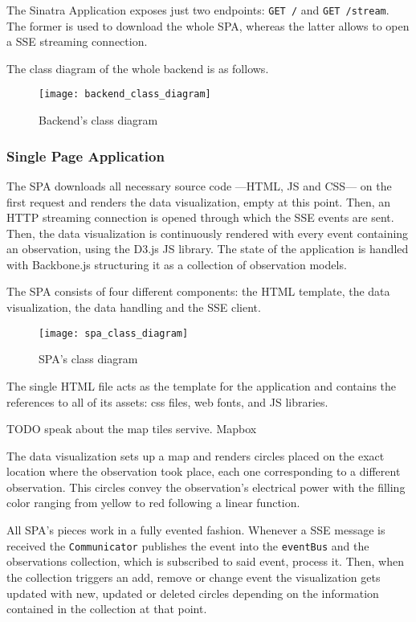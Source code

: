 The Sinatra Application exposes just two endpoints: \texttt{GET /} and \texttt{GET /stream}. The former is used to download the whole SPA, whereas the latter allows to open a SSE streaming connection.

The class diagram of the whole backend is as follows.

\begin{figure}[H]
	\centering
	\texttt{[image: backend\_class\_diagram]}
	\caption{Backend's class diagram}
	\label{fig:backend_class_diagram}
\end{figure}

\subsubsection{Single Page Application}

The SPA downloads all necessary source code ---HTML, JS and CSS--- on the first request and renders the data visualization, empty at this point. Then, an HTTP streaming connection is opened  through which the SSE events are sent. Then, the data visualization is continuously rendered with every event containing an observation, using the D3.js JS library. The state of the application is handled with Backbone.js structuring it as a collection of observation models.

The SPA consists of four different components: the HTML template, the data visualization, the data handling and the SSE client.

\begin{figure}[p]
	\centering
	\texttt{[image: spa\_class\_diagram]}
	\caption{SPA's class diagram}
	\label{fig:spa_class_diagram}
\end{figure}

The single HTML file acts as the template for the application and contains the references to all of its assets: css files, web fonts, and JS libraries.

TODO speak about the map tiles servive. Mapbox

The data visualization sets up a map and renders circles placed on the exact location where the observation took place, each one corresponding to a different observation. This circles convey the observation's electrical power with the filling color ranging from yellow to red following a linear function.

All SPA's pieces work in a fully evented fashion. Whenever a SSE message is received the \texttt{Communicator} publishes the event into the \texttt{eventBus} and the observations collection, which is subscribed to said event, process it. Then, when the collection triggers an add, remove or change event the visualization gets updated with new, updated or deleted circles depending on the information contained in the collection at that point.